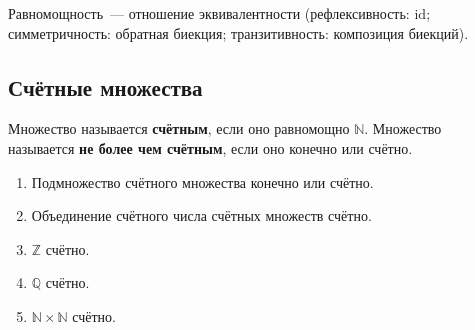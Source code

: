 \documentclass[12pt]{article}
\begin{document}
	\begin{note}
		Равномощность~--- отношение эквивалентности (рефлексивность: $\text{id}$; симметричность: обратная биекция; транзитивность: композиция биекций).
	\end{note}
	
	\subsection{Счётные множества}
	
	\begin{definition}
		Множество называется \textbf{счётным}, если оно равномощно $\mathbb{N}$.
		Множество называется \textbf{не более чем счётным}, если оно конечно или счётно.
	\end{definition}
	
	\begin{theorem}
		\begin{enumerate}
			\item Подмножество счётного множества конечно или счётно.
			\item Объединение счётного числа счётных множеств счётно.
			\item $\mathbb{Z}$ счётно.
			\item $\mathbb{Q}$ счётно.
			\item $\mathbb{N} \times \mathbb{N}$ счётно.
		\end{enumerate}
	\end{theorem}
	
\end{document}
